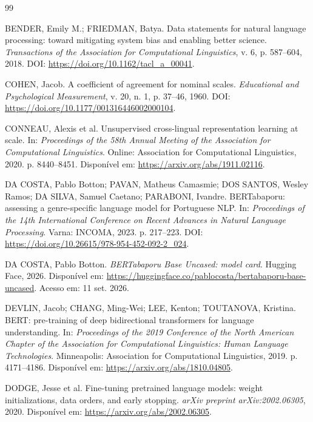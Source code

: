 \begin{thebibliography}{99}

BENDER, Emily M.; FRIEDMAN, Batya.
Data statements for natural language processing: toward mitigating system bias
and enabling better science.
\textit{Transactions of the Association for Computational Linguistics}, v. 6,
p. 587--604, 2018.
DOI: \url{https://doi.org/10.1162/tacl_a_00041}.

COHEN, Jacob.
A coefficient of agreement for nominal scales.
\textit{Educational and Psychological Measurement}, v. 20, n. 1, p. 37--46,
1960.
DOI: \url{https://doi.org/10.1177/001316446002000104}.

CONNEAU, Alexis et al.
Unsupervised cross-lingual representation learning at scale.
In: \textit{Proceedings of the 58th Annual Meeting of the Association for
Computational Linguistics}. Online: Association for Computational Linguistics,
2020. p. 8440--8451.
Disponível em: \url{https://arxiv.org/abs/1911.02116}.

DA COSTA, Pablo Botton; PAVAN, Matheus Camasmie; DOS SANTOS, Wesley Ramos;
DA SILVA, Samuel Caetano; PARABONI, Ivandre.
BERTabaporu: assessing a genre-specific language model for Portuguese NLP.
In: \textit{Proceedings of the 14th International Conference on Recent Advances
in Natural Language Processing}. Varna: INCOMA, 2023. p. 217--223.
DOI: \url{https://doi.org/10.26615/978-954-452-092-2_024}.

DA COSTA, Pablo Botton.
\textit{BERTabaporu Base Uncased: model card}.
Hugging Face, 2026. Disponível em:
\url{https://huggingface.co/pablocosta/bertabaporu-base-uncased}.
Acesso em: 11 set. 2026.

DEVLIN, Jacob; CHANG, Ming-Wei; LEE, Kenton; TOUTANOVA, Kristina.
BERT: pre-training of deep bidirectional transformers for language understanding.
In: \textit{Proceedings of the 2019 Conference of the North American Chapter of
the Association for Computational Linguistics: Human Language Technologies}.
Minneapolis: Association for Computational Linguistics, 2019. p. 4171--4186.
Disponível em: \url{https://arxiv.org/abs/1810.04805}.

DODGE, Jesse et al.
Fine-tuning pretrained language models: weight initializations, data orders,
and early stopping.
\textit{arXiv preprint arXiv:2002.06305}, 2020.
Disponível em: \url{https://arxiv.org/abs/2002.06305}.


\end{thebibliography}
